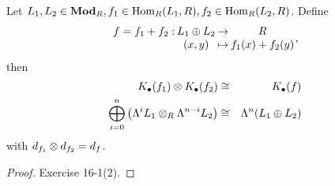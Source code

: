 \begin{prop}
  Let $L_1, L_2 \in \mathbf{Mod}_R, f_1 \in \operatorname{Hom}_R(L_1, R), f_2 \in \operatorname{Hom}_R(L_2, R)$.
  Define
  $$\deffunc{f = f_1 + f_2}{L_1 \Op L_2}{R}{(x, y)}{f_1(x) + f_2(y)}, $$
  then 
  \begin{eqnarray*}
    K_\bullet(f_1) \otimes K_\bullet(f_2) &\cong& K_\bullet(f) \\
    \bigoplus\limits_{i=0}^n\left(\Lambda^i L_1 \otimes_R \Lambda^{n-i} L_2\right)
    &\cong& \Lambda^n(L_1 \oplus L_2)
  \end{eqnarray*}
  with
  $d_{f_1} \otimes d_{f_2} = d_f$.

  \begin{proof}
    Exercise 16-1(2).
  \end{proof}
\end{prop}
